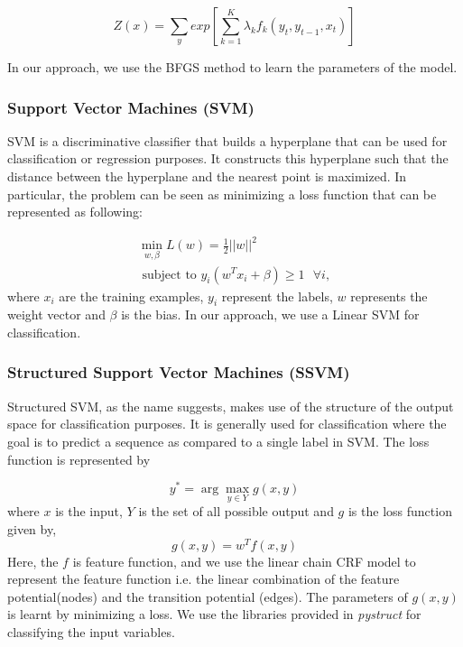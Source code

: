 \documentclass[11pt, oneside]{article}   	%
\begin{document}

\begin{equation}
Z(x)=\sum_{y}^{}exp\left[{\sum_{k=1}^{K}}{\lambda}_{k}{f}_{k}({y}_{t},{y}_{t-1},{x}_{t})\right]
\end{equation}

In our approach, we use the BFGS method to learn the parameters of the model. 

\subsubsection{Support Vector Machines (SVM)}  
SVM is a discriminative classifier that builds a hyperplane that can be used for classification or regression purposes. It constructs this hyperplane such that 
the distance between the hyperplane and the nearest point is maximized.  In particular, the problem can be seen as minimizing a loss function that can be represented as following:

\begin{align*}
\min_{w, \beta} L(w) = \frac{1}{2}||w||^{2} \\ 
\text{ subject to } y_{i}(w^{T} x_{i} + \beta) \geq 1 \text{ } \forall i,
\end{align*}
where $x_i$ are the training examples, $y_i$ represent the labels, $w$ represents the weight vector and $\beta$ is the bias. In our approach, we use
a Linear SVM for classification.
 
\subsubsection{Structured Support Vector Machines (SSVM)}
Structured SVM, as the name suggests, makes use of the structure of the output space for classification purposes. It is generally used for classification where the goal is to predict a sequence as compared to a single label in SVM. The loss function is represented by

\begin{equation}
y^* = \arg \max_{y \in Y} g(x, y)
\end{equation}
where $x$ is the input, $Y$ is the set of all possible output and $g$ is the loss function given by,
\begin{equation}
g(x, y) = w^T f(x, y)
\end{equation}
Here, the $f$ is feature function, and we use the linear chain CRF model to represent the feature function i.e. the linear combination of the feature potential(nodes) and the transition potential (edges). The parameters of $g(x,y)$ is learnt by minimizing a loss. We use the libraries provided in \emph{pystruct} for classifying the input variables.
\end{document}

